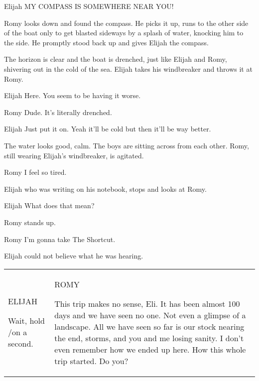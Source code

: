 \documentclass{screenplay}
\begin{document}
\begin{dialogue}{Elijah}
    MY COMPASS IS SOMEWHERE NEAR YOU!
\end{dialogue}

Romy looks down and found the compass. He picks it up, runs to the other side of the boat only to get blasted sideways by a splash of water, knocking him to the side. He promptly stood back up and gives Elijah the compass.


The horizon is clear and the boat is drenched, just like Elijah and Romy, shivering out in the cold of the sea. Elijah takes his windbreaker and throws it at Romy.

\begin{dialogue}{Elijah}
    Here. You seem to be having it worse.
\end{dialogue}

\begin{dialogue}{Romy}
    Dude. It's literally drenched.
\end{dialogue}

\begin{dialogue}{Elijah}
    Just put it on. Yeah it'll be cold but then it'll be way better.
\end{dialogue}


The water looks good, calm. The boys are sitting across from each other. Romy, still wearing Elijah's windbreaker, is agitated.

\begin{dialogue}{Romy}
    I feel so tired.
\end{dialogue}

Elijah who was writing on his notebook, stops and looks at Romy.

\begin{dialogue}{Elijah}
    What does that mean?
\end{dialogue}

Romy stands up.

\begin{dialogue}{Romy}
    I'm gonna take The Shortcut.
\end{dialogue}

Elijah could not believe what he was hearing.

\setlength{\tabcolsep}{0pt}
\begin{tabularx}{\linewidth}{XX}
    \hspace{1.2in} ELIJAH

    Wait, hold /on a second. 

    &

    \hspace{1.2in} ROMY

    This trip makes no sense, Eli. It has been almost 100 days and we have seen no one. Not even a glimpse of a landscape. All we have seen so far is our stock nearing the end, storms, and you and me losing sanity. I don't even remember how we ended up here. How this whole trip started. Do you?
\end{tabularx}
\end{document}
